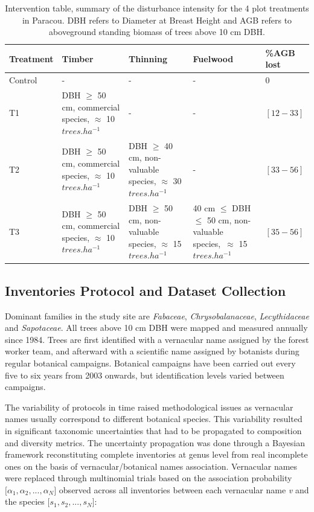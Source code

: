 \documentclass[fleqn,10pt]{ArtEcoFoG} %
\begin{document}
\begin{table}[t]

\caption{\label{tab:Tab1}Intervention table, summary of the disturbance intensity for the 4 plot treatments in Paracou. DBH refers to Diameter at Breast Height and AGB refers to aboveground standing biomass of trees above 10 cm DBH.}
\centering
\begin{tabu} to 
\toprule
Treatment & Timber & Thinning & Fuelwood & \%AGB lost\\
\midrule
Control & - & - & - & 0\\
T1 & DBH $\geq$ 50 cm, commercial species, $\approx$ 10   $trees.ha^{-1}$ & - & - & $[12-33]$\\
T2 & DBH $\geq$ 50 cm, commercial species, $\approx$ 10  $trees.ha^{-1}$ & DBH $\geq$ 40 cm, non-valuable species, $\approx$ 30   $trees.ha^{-1}$ & - & $[33-56]$\\
T3 & DBH $\geq$ 50 cm, commercial species, $\approx$ 10  $trees.ha^{-1}$ & DBH $\geq$ 50 cm, non-valuable species, $\approx$ 15  $trees.ha^{-1}$ & 40 cm $\leq$ DBH $\leq$ 50 cm, non-valuable species,\ $\approx$ 15 $trees.ha^{-1}$ & $[35-56]$\\
\bottomrule
\end{tabu}
\end{table}\ignorespacesafterend

\hypertarget{inventories-protocol-and-dataset-collection}{%
\subsection{Inventories Protocol and Dataset Collection}\label{inventories-protocol-and-dataset-collection}}

Dominant families in the study site are \emph{Fabaceae}, \emph{Chrysobalanaceae}, \emph{Lecythidaceae} and \emph{Sapotaceae}.
All trees above 10 cm DBH were mapped and measured annually since 1984.
Trees are first identified with a vernacular name assigned by the forest worker team, and afterward with a scientific name assigned by botanists during regular botanical campaigns.
Botanical campaigns have been carried out every five to six years from 2003 onwards, but identification levels varied between campaigns.

The variability of protocols in time raised methodological issues as vernacular names usually correspond to different botanical species.
This variability resulted in significant taxonomic uncertainties that had to be propagated to composition and diversity metrics.
The uncertainty propagation was done through a Bayesian framework reconstituting complete inventories at genus level from real incomplete ones on the basis of vernacular/botanical names association.
Vernacular names were replaced through multinomial trials based on the association probability \(\big[\alpha_1, \alpha_2,..., \alpha_N\big]\) observed across all inventories between each vernacular name \emph{v} and the species \(\big[s_1, s_2,..., s_N\big]\):
\end{document}
